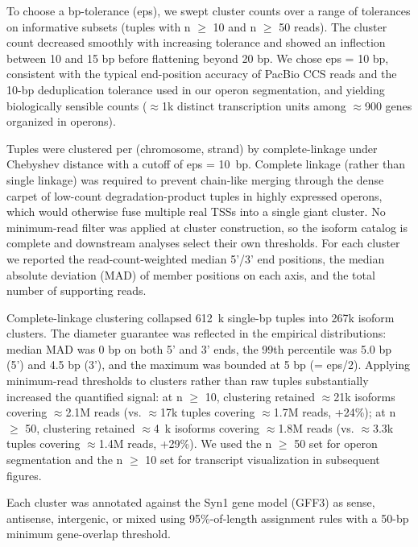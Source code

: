 To choose a bp-tolerance (eps), we swept cluster counts over a range of tolerances on informative subsets (tuples with n $\geq$ 10 and n $\geq$ 50 reads). The cluster count decreased smoothly with increasing tolerance and showed an inflection between 10 and 15 bp before flattening beyond 20 bp. We chose eps = 10 bp, consistent with the typical end-position accuracy of PacBio CCS reads and the 10-bp deduplication tolerance used in our operon segmentation, and yielding biologically sensible counts ($\approx$1k distinct transcription units among $\approx$900 genes organized in operons).

Tuples were clustered per (chromosome, strand) by complete-linkage under Chebyshev distance with a cutoff of eps = 10~bp. Complete linkage (rather than single linkage) was required to prevent chain-like merging through the dense carpet of low-count degradation-product tuples in highly expressed operons, which would otherwise fuse multiple real TSSs into a single giant cluster. No minimum-read filter was applied at cluster construction, so the isoform catalog is complete and downstream analyses select their own thresholds. For each cluster we reported the read-count-weighted median 5'/3' end positions, the median absolute deviation (MAD) of member positions on each axis, and the total number of supporting reads.

Complete-linkage clustering collapsed 612~k single-bp tuples into 267k isoform clusters. The diameter guarantee was reflected in the empirical distributions: median MAD was 0 bp on both 5' and 3' ends, the 99th percentile was 5.0 bp (5') and 4.5 bp (3'), and the maximum was bounded at 5 bp (= eps/2). Applying minimum-read thresholds to clusters rather than raw tuples substantially increased the quantified signal: at n $\geq$ 10, clustering retained $\approx$21k isoforms covering $\approx$2.1M reads (vs. $\approx$17k tuples covering $\approx$1.7M reads, +24\%); at n $\geq$ 50, clustering retained $\approx$4~k isoforms covering $\approx$1.8M reads (vs. $\approx$3.3k tuples covering $\approx$1.4M reads, +29\%). We used the n $\geq$ 50 set for operon segmentation and the n $\geq$ 10 set for transcript visualization in subsequent figures.

Each cluster was annotated against the Syn1 gene model (GFF3) as sense, antisense, intergenic, or mixed using 95\%-of-length assignment rules with a 50-bp minimum gene-overlap threshold.